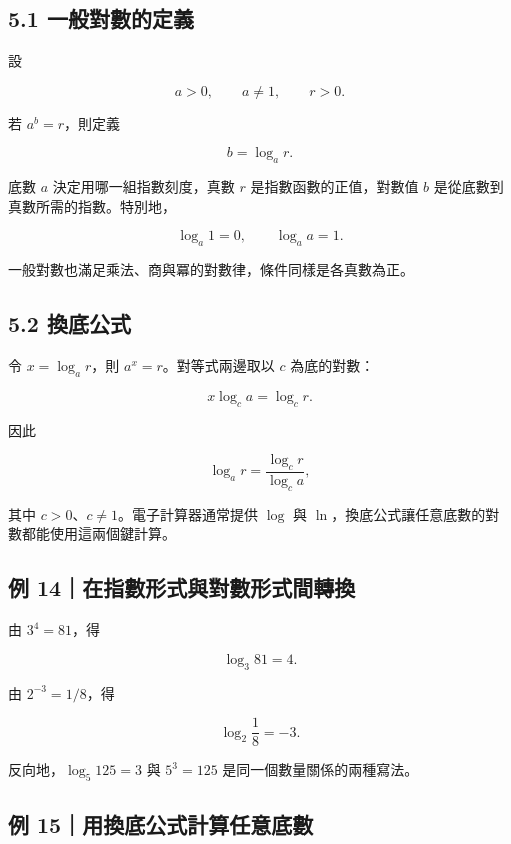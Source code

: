 \documentclass[11pt,a4paper]{article}
\begin{document}
\subsection{5.1 一般對數的定義}\label{ux4e00ux822cux5c0dux6578ux7684ux5b9aux7fa9}

設

\[
a>0,\qquad a\ne1,\qquad r>0.
\]

若 \(a^b=r\)，則定義

\[
b=\log_a r.
\]

底數 \(a\) 決定用哪一組指數刻度，真數 \(r\) 是指數函數的正值，對數值 \(b\) 是從底數到真數所需的指數。特別地，

\[
\log_a1=0,\qquad \log_aa=1.
\]

一般對數也滿足乘法、商與冪的對數律，條件同樣是各真數為正。

\subsection{5.2 換底公式}\label{ux63dbux5e95ux516cux5f0f}

令 \(x=\log_a r\)，則 \(a^x=r\)。對等式兩邊取以 \(c\) 為底的對數：

\[
x\log_c a=\log_c r.
\]

因此

\[
\boxed{\log_a r=\frac{\log_c r}{\log_c a}},
\]

其中 \(c>0\)、\(c\ne1\)。電子計算器通常提供 \(\log\) 與 \(\ln\)，換底公式讓任意底數的對數都能使用這兩個鍵計算。

\subsection{例 14｜在指數形式與對數形式間轉換}\label{ux4f8b-14ux5728ux6307ux6578ux5f62ux5f0fux8207ux5c0dux6578ux5f62ux5f0fux9593ux8f49ux63db}

由 \(3^4=81\)，得

\[
\log_3 81=4.
\]

由 \(2^{-3}=1/8\)，得

\[
\log_2\frac18=-3.
\]

反向地，\(\log_5 125=3\) 與 \(5^3=125\) 是同一個數量關係的兩種寫法。

\subsection{例 15｜用換底公式計算任意底數}\label{ux4f8b-15ux7528ux63dbux5e95ux516cux5f0fux8a08ux7b97ux4efbux610fux5e95ux6578}
\end{document}
